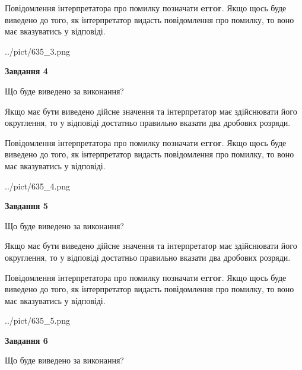\documentclass[12pt, ukrainian]{article}
\begin{document}
{\begin {Large}
Повідомлення інтерпретатора про помилку позначати \textbf{error}.
Якщо щось буде виведено до того, як інтерпретатор видасть повідомлення про помилку, 
то воно має вказуватись у відповіді. \par

\begin{center}
	{../pict/635_3.png}
\end{center}
\newpage

{\begin {center}\textbf{Завдання 4}\end {center}}\par
Що буде виведено за виконання? \par

Якщо має бути виведено дійсне значення та інтерпретатор має здійснювати його округлення, 
то у відповіді достатньо правильно вказати два дробових розряди.

Повідомлення інтерпретатора про помилку позначати \textbf{error}.
Якщо щось буде виведено до того, як інтерпретатор видасть повідомлення про помилку, 
то воно має вказуватись у відповіді. \par

\begin{center}
	{../pict/635_4.png}
\end{center}
\newpage

{\begin {center}\textbf{Завдання 5}\end {center}}\par
Що буде виведено за виконання? \par

Якщо має бути виведено дійсне значення та інтерпретатор має здійснювати його округлення, 
то у відповіді достатньо правильно вказати два дробових розряди.

Повідомлення інтерпретатора про помилку позначати \textbf{error}.
Якщо щось буде виведено до того, як інтерпретатор видасть повідомлення про помилку, 
то воно має вказуватись у відповіді. \par

\begin{center}
	{../pict/635_5.png}
\end{center}
\newpage

{\begin {center}\textbf{Завдання 6}\end {center}}\par
Що буде виведено за виконання? \par


\end{Large}}
\end{document}
